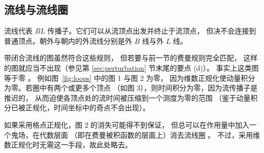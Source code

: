 \subsection{流线与流线圈}\label{ssec:flowlines}

流线代表 $BL$ 传播子。它们可以从流顶点出发并终止于流顶点，
但决不会连接到普通顶点。朝外与朝内的外流线分别是外 $B$ 线与外 $L$ 线。

带闭合流线的图虽然符合这些规则，
但若要与前一节的费曼规则完全匹配，
这样的图就应当不出现（参见第 \ref{sec:perturbation} 节末尾的要点 (d)）。
事实上这类图等于零 \cite{ZinnZwanziger}。
例如图~\ref{fig:loops} 中的图 1 与图 2 为零，
因为维数正规化使动量积分为零。若圈中有两个或更多个顶点
（如图 3），则时间积分为零，因为流传播子是推迟的，
从而迫使各顶点处的流时间被压缩到一个测度为零的范围
（鉴于动量积分已被正规化，时间坐标中的奇点不会出现）。

如果采用格点正规化，图 2 的消失可能得不到保证，
但总可以在作用量中加入一个鬼场，在代数层面
（即在费曼被积函数的层面上）消去流线圈 \cite{Zinn}。
不过，采用维数正规化时无需这一手段，故此处略去。
